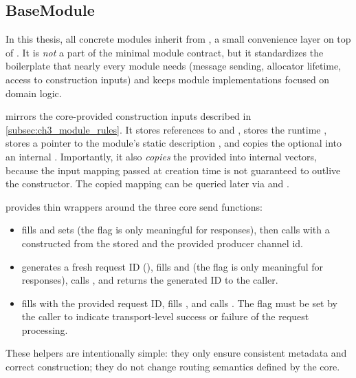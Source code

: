 \subsection{BaseModule} \label{subsec:ch3_basemodule}

In this thesis, all concrete modules inherit from , a small convenience layer on top of . It is \emph{not} a part of the minimal module contract, but it standardizes the boilerplate that nearly every module needs (message sending, allocator lifetime, access to construction inputs) and keeps module implementations focused on domain logic.

 mirrors the core-provided construction inputs described in \autoref{subsec:ch3_module_rules}. It stores references to  and , stores the runtime , stores a pointer to the module's static description , and copies the optional  into an internal . Importantly, it also \emph{copies} the provided  into internal vectors, because the input mapping passed at creation time is not guaranteed to outlive the constructor. The copied mapping can be queried later via  and .

 provides thin wrappers around the three core send functions:
\begin{itemize}
    \item {} fills  and sets  (the  flag is only meaningful for responses), then calls  with a  constructed from the stored  and the provided producer channel id.
    \item {} generates a fresh request ID (), fills  and  (the  flag is only meaningful for responses), calls , and returns the generated ID to the caller.
    \item {} fills  with the provided request ID, fills , and calls . The  flag must be set by the caller to indicate transport-level success or failure of the request processing.
\end{itemize}
These helpers are intentionally simple: they only ensure consistent metadata and correct  construction; they do not change routing semantics defined by the core.

